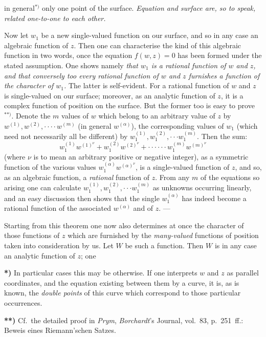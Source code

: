\documentclass{article}
\begin{document}
in general${}^{*)}$ only one point of the surface. \emph{Equation and surface are, so to speak, related one-to-one to each other.}

Now let $w_{1}$ be a new single-valued function on our surface, and so in any case an algebraic function of $z$. Then one can characterise the kind of this algebraic function in two words, once the equation $f(w, z) = 0$ has been formed under the stated assumption. One shows namely \emph{that $w_{1}$ is a rational function of $w$ and $z$, and that conversely too every rational function of $w$ and $z$ furnishes a function of the character of $w_{1}$.} The latter is self-evident. For a rational function of $w$ and $z$ is single-valued on our surface; moreover, as an analytic function of $z$, it is a complex function of position on the surface. But the former too is easy to prove${}^{**)}$. Denote the $m$ values of $w$ which belong to an arbitrary value of $z$ by $w^{(1)}, w^{(2)}, \cdot\cdot\cdot\cdot w^{(m)}$ (in general $w^{(\alpha)}$), the corresponding values of $w_{1}$ (which need not necessarily all be different) by $w_{1}^{(1)}, w_{1}^{(2)}, \cdot\cdot\cdot w_{1}^{(m)}$. Then the sum:
\[ w_{1}^{(1)} w^{(1)^{\nu}} + w_{1}^{(2)} w^{(2)^{\nu}} + \cdot\cdot\cdot\cdot\cdot\cdot w_{1}^{(m)} w^{(m)^{\nu}} \]
(where $\nu$ is to mean an arbitrary positive or negative integer), as a symmetric function of the various values $w_{1}^{(\alpha)} w^{(\alpha)^{\nu}}$, is a single-valued function of $z$, and so, as an algebraic function, a \emph{rational} function of $z$. From any $m$ of the equations so arising one can calculate $w_{1}^{(1)}, w_{1}^{(2)}, \cdot\cdot\cdot w_{1}^{(m)}$ as unknowns occurring linearly, and an easy discussion then shows that the single $w_{1}^{(\alpha)}$ has indeed become a rational function of the associated $w^{(\alpha)}$ and of $z$. ---

Starting from this theorem one now also determines at once the character of those functions of $z$ which are furnished by the \emph{many-valued} functions of position taken into consideration by us. Let $W$ be such a function. Then $W$ is in any case an analytic function of $z$; one

\textbf{*)} In particular cases this may be otherwise. If one interprets $w$ and $z$ as parallel coordinates, and the equation existing between them by a curve, it is, as is known, the \emph{double points} of this curve which correspond to those particular occurrences.

\textbf{**)} Cf.\ the detailed proof in \emph{Prym}, \emph{Borchardt}'s Journal, vol.~83, p.~251~ff.: Beweis eines Riemann'schen Satzes.
\end{document}
